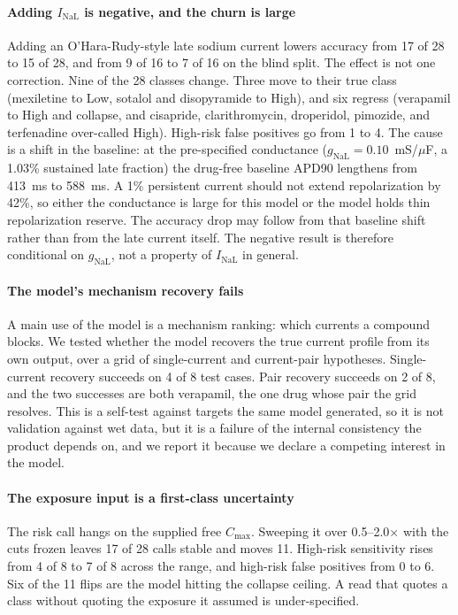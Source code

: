\documentclass[preprint,12pt]{elsarticle}
\begin{document}
\paragraph{Adding $I_{\mathrm{NaL}}$ is negative, and the churn is large}
Adding an O'Hara-Rudy-style late sodium current lowers accuracy from 17 of 28 to 15 of
28, and from 9 of 16 to 7 of 16 on the blind split. The effect is not one correction. Nine
of the 28 classes change. Three move to their true class (mexiletine to Low, sotalol and
disopyramide to High), and six regress (verapamil to High and collapse, and cisapride,
clarithromycin, droperidol, pimozide, and terfenadine over-called High). High-risk false
positives go from 1 to 4. The cause is a shift in the baseline: at the pre-specified
conductance ($g_{\mathrm{NaL}} = 0.10$~mS/$\mu$F, a 1.03\% sustained late fraction) the
drug-free baseline APD90 lengthens from 413~ms to 588~ms. A 1\% persistent current should
not extend repolarization by 42\%, so either the conductance is large for this model or
the model holds thin repolarization reserve. The accuracy drop may follow from that
baseline shift rather than from the late current itself. The negative result is
therefore conditional on $g_{\mathrm{NaL}}$, not a property of $I_{\mathrm{NaL}}$ in
general.

\paragraph{The model's mechanism recovery fails}
A main use of the model is a mechanism ranking: which currents a compound blocks.
We tested whether the model recovers the true current profile from its own output, over
a grid of single-current and current-pair hypotheses. Single-current recovery
succeeds on 4 of 8 test cases. Pair recovery succeeds on 2 of 8, and the two successes
are both verapamil, the one drug whose pair the grid resolves. This is a self-test
against targets the same model generated, so it is not validation against wet data, but
it is a failure of the internal consistency the product depends on, and we report it
because we declare a competing interest in the model.

\paragraph{The exposure input is a first-class uncertainty}
The risk call hangs on the supplied free $C_{\mathrm{max}}$. Sweeping it over
0.5--2.0$\times$ with the cuts frozen leaves 17 of 28 calls stable and moves 11. High-risk
sensitivity rises from 4 of 8 to 7 of 8 across the range, and high-risk false positives
from 0 to 6. Six of the 11 flips are the model hitting the collapse ceiling. A read that
quotes a class without quoting the exposure it assumed is under-specified.
\end{document}
